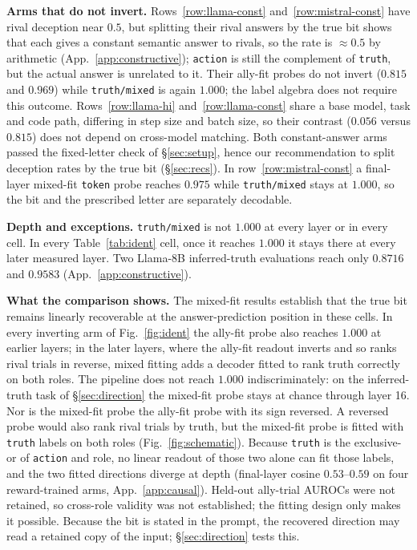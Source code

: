\documentclass{article}
\newcommand{\tm}{\texttt{truth/mixed}}
\begin{document}
\textbf{Arms that do not invert.} Rows~\ref{row:llama-const} and~\ref{row:mistral-const} have rival deception near $0.5$, but splitting their rival answers by the true bit shows that each gives a constant semantic answer to rivals, so the rate is ${\approx}0.5$ by arithmetic (App.~\ref{app:constructive}); \texttt{action} is still the complement of \texttt{truth}, but the actual answer is unrelated to it. Their ally-fit probes do not invert ($0.815$ and $0.969$) while \tm{} is again $1.000$; the label algebra does not require this outcome. Rows~\ref{row:llama-hi} and~\ref{row:llama-const} share a base model, task and code path, differing in step size and batch size, so their contrast ($0.056$ versus $0.815$) does not depend on cross-model matching. Both constant-answer arms passed the fixed-letter check of \S\ref{sec:setup}, hence our recommendation to split deception rates by the true bit (\S\ref{sec:recs}). In row~\ref{row:mistral-const} a final-layer mixed-fit \texttt{token} probe reaches $0.975$ while \tm{} stays at $1.000$, so the bit and the prescribed letter are separately decodable.

\textbf{Depth and exceptions.} \tm{} is not $1.000$ at every layer or in every cell. In every Table~\ref{tab:ident} cell, once it reaches $1.000$ it stays there at every later measured layer. Two Llama-8B inferred-truth evaluations reach only $0.8716$ and $0.9583$ (App.~\ref{app:constructive}).

\textbf{What the comparison shows.} The mixed-fit results establish that the true bit remains linearly recoverable at the answer-prediction position in these cells. In every inverting arm of Fig.~\ref{fig:ident} the ally-fit probe also reaches $1.000$ at earlier layers; in the later layers, where the ally-fit readout inverts and so ranks rival trials in reverse, mixed fitting adds a decoder fitted to rank truth correctly on both roles. The pipeline does not reach $1.000$ indiscriminately: on the inferred-truth task of \S\ref{sec:direction} the mixed-fit probe stays at chance through layer 16. Nor is the mixed-fit probe the ally-fit probe with its sign reversed. A reversed probe would also rank rival trials by truth, but the mixed-fit probe is fitted with \texttt{truth} labels on both roles (Fig.~\ref{fig:schematic}). Because \texttt{truth} is the exclusive-or of \texttt{action} and role, no linear readout of those two alone can fit those labels, and the two fitted directions diverge at depth (final-layer cosine $0.53$--$0.59$ on four reward-trained arms, App.~\ref{app:causal}). Held-out ally-trial AUROCs were not retained, so cross-role validity was not established; the fitting design only makes it possible. Because the bit is stated in the prompt, the recovered direction may read a retained copy of the input; \S\ref{sec:direction} tests this.
\end{document}

